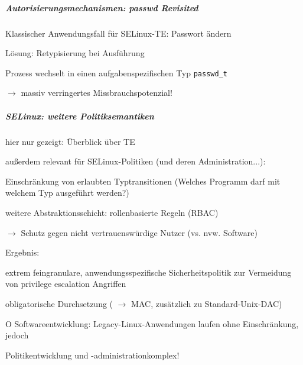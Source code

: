 \documentclass[a4paper]{article}
\newcommand{\cmark}{\ding{51}}
\newcommand{\xmark}{\ding{55}}
\begin{document}
\begin{multicols}{3}
    \subparagraph{Autorisierungsmechanismen: passwd
        Revisited}

    Klassischer Anwendungsfall für SELinux-TE: Passwort ändern

    Lösung: Retypisierung bei Ausführung

    \begin{itemize*}
        \item
        Prozess wechselt in einen aufgabenspezifischen Typ \texttt{passwd\_t}
        \item
        $\rightarrow$ massiv verringertes
        Missbrauchspotenzial!
        \item
    \end{itemize*}


    \subparagraph{SELinux: weitere
        Politiksemantiken}

    \begin{itemize*}
        \item
        hier nur gezeigt: Überblick über TE
        \item
        außerdem relevant für SELinux-Politiken (und deren Administration...):
        \begin{itemize*}
            \item Einschränkung von erlaubten Typtransitionen (Welches Programm darf mit welchem Typ ausgeführt werden?)
            \item weitere Abstraktionsschicht: rollenbasierte Regeln (RBAC)
            \item $\rightarrow$ Schutz gegen nicht vertrauenswürdige Nutzer (vs. nvw. Software)
        \end{itemize*}
        \item
        Ergebnis:
        \begin{itemize*}
            \item \cmark extrem feingranulare, anwendungsspezifische Sicherheitspolitik zur Vermeidung von privilege escalation Angriffen
            \item \cmark obligatorische Durchsetzung ( $\rightarrow$ MAC, zusätzlich zu Standard-Unix-DAC)
            \item O Softwareentwicklung: Legacy-Linux-Anwendungen laufen ohne Einschränkung, jedoch
            \item \xmark Politikentwicklung und -administrationkomplex!
        \end{itemize*}
    \end{itemize*}



\end{multicols}
\end{document}
